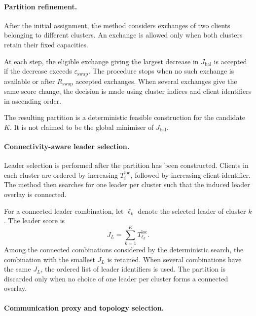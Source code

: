 \documentclass[pdflatex,sn-mathphys-num]{sn-jnl}
\begin{document}
\paragraph{Partition refinement.}

After the initial assignment, the method considers exchanges of two clients belonging to different clusters. An exchange is allowed only when both clusters retain their fixed capacities.

At each step, the eligible exchange giving the largest decrease in \(J_{\mathrm{bal}}\) is accepted if the decrease exceeds \(\varepsilon_{\mathrm{swap}}\). The procedure stops when no such exchange is available or after \(R_{\mathrm{swap}}\) accepted exchanges. When several exchanges give the same score change, the decision is made using cluster indices and client identifiers in ascending order.

The resulting partition is a deterministic feasible construction for the candidate \(K\). It is not claimed to be the global minimiser of \(J_{\mathrm{bal}}\).

\paragraph{Connectivity-aware leader selection.}

Leader selection is performed after the partition has been constructed. Clients in each cluster are ordered by increasing \(T_i^{\mathrm{loc}}\), followed by increasing client identifier. The method then searches for one leader per cluster such that the induced leader overlay is connected.

For a connected leader combination, let \(\ell_k\) denote the selected leader of cluster \(k\). The leader score is
\begin{equation}
J_L
=
\sum_{k=1}^{K}
T_{\ell_k}^{\mathrm{loc}} .
\label{eq:supp_leader_selection_score}
\end{equation}
Among the connected combinations considered by the deterministic search, the combination with the smallest \(J_L\) is retained. When several combinations have the same \(J_L\), the ordered list of leader identifiers is used. The partition is discarded only when no choice of one leader per cluster forms a connected overlay.

\paragraph{Communication proxy and topology selection.}
\end{document}
